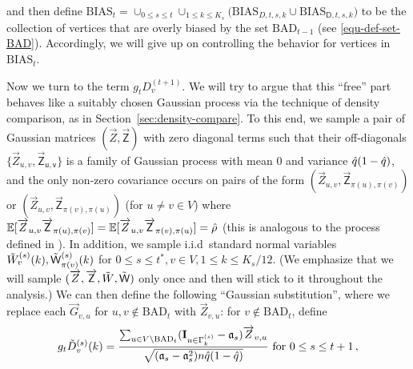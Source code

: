 \documentclass[11pt]{article}
\numberwithin{equation}{section}
\begin{document}
and then define $\mathrm{BIAS}_t = \cup_{0 \leq s \leq t} \cup_{1 \leq k \leq K_s} \big( \mathrm{BIAS}_{D,t,s,k} \cup \mathrm{BIAS}_{\mathsf{D},t,s,k} \big)$ to be the collection of vertices that are overly biased by the set $\mathrm{BAD}_{t-1}$ (see \eqref{equ-def-set-BAD}). Accordingly, we will give up on controlling the behavior for vertices in $\mathrm{BIAS}_t$.

Now we turn to the term  $g_t D^{(t+1)}_v$. We will try to argue that this ``free'' part behaves like a suitably chosen Gaussian process via the technique of density comparison, as in Section~\ref{sec:density-compare}. To this end, we sample a pair of Gaussian matrices $(\overrightarrow{Z}, \overrightarrow{\mathsf{Z}})$ with zero diagonal terms  such that their off-diagonals $\{ \overrightarrow{Z}_{u,v}, \overrightarrow{\mathsf{Z}}_{\mathsf{u,v}} \}$ is a family of Gaussian process with mean 0 and variance $\Hat{q}(1-\Hat{q})$, and the only non-zero covariance occurs on pairs of the form $(\overrightarrow{Z}_{u,v},  \overrightarrow{\mathsf{Z}}_{\pi(u),\pi(v)})$ or $(\overrightarrow{Z}_{u,v},  \overrightarrow{\mathsf{Z}}_{\pi(v),\pi(u)})$ (for $u\neq v\in V$) where  $\mathbb{E}[ \overrightarrow{Z}_{u,v} \overrightarrow{\mathsf{Z}}_{\pi(u),\pi(v)} ] = \mathbb{E}[ \overrightarrow{Z}_{u,v} \overrightarrow{\mathsf{Z}}_{\pi(v),\pi(u)} ] = \Hat{\rho}$ (this is analogous to the process defined in \cite[Section 2.1]{DL22+}). In addition, we sample i.i.d\ standard normal variables $\Tilde{W}^{(s)}_v(k), \Tilde{\mathsf{W}}^{(s)}_{\pi(v)}(k)$ for  $0 \leq s \leq t^*, v \in V, 1 \leq k \leq K_s/12$. (We emphasize that we will sample $(\overrightarrow{Z}, \overrightarrow{\mathsf{Z}}, \Tilde{W},\Tilde{\mathsf{W}})$ only once and then will stick to it throughout the analysis.) We can then define the following ``Gaussian substitution'', where we  replace each $\overrightarrow{G}_{v,u}$ for $u,v \not \in \mathrm{BAD}_{t}$ with $\overrightarrow{Z}_{v,u}$: for $v \not \in \mathrm{BAD}_{t}$, define  
\begin{align}
    g_{t} \Tilde{D}^{(s)}_v (k) = \frac{ \sum_{u \in V \setminus \mathrm{BAD}_{t}} (\mathbf{I}_{u \in \Gamma^{(s)}_k} - \mathfrak{a}_s) \overrightarrow{Z}_{v,u} } {\sqrt{(\mathfrak{a}_s-\mathfrak{a}_s^2) n \Hat{q}(1-\Hat{q})}} \mbox{ for } 0 \leq s \leq t+1 \,,
    \label{equ-def-g-Tilde-D}
\end{align}
\end{document}
